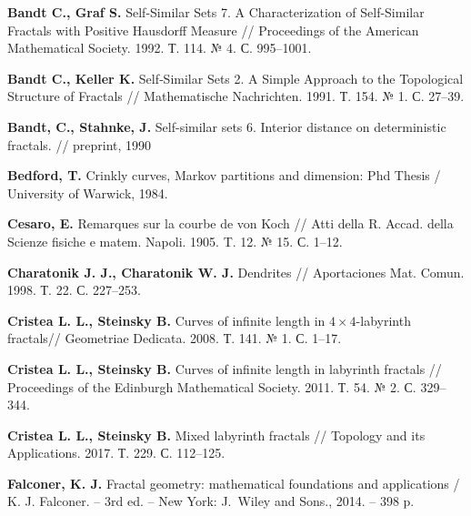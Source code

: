 %
%




\begin{thebibliography}{99}

{\bf Bandt C., Graf S. }
Self-Similar Sets 7. A Characterization of Self-Similar Fractals with Positive Hausdorff Measure // Proceedings of the American Mathematical Society. 1992. Т. 114. № 4. С. 995–1001.

{\bf Bandt C., Keller K.}
Self‐Similar Sets 2. A Simple Approach to the Topological Structure of Fractals // 
Mathematische Nachrichten. 1991. Т. 154. № 1. С. 27--39.

{\bf Bandt, C., Stahnke, J.}
Self-similar sets 6. Interior distance on deterministic fractals. //
preprint, 1990

{\bf Bedford, T. }
Crinkly curves, Markov partitions and dimension: Phd Thesis / University of Warwick, 1984.

{\bf Cesaro, E.} 
Remarques sur la courbe de von Koch // 
Atti della R. Accad. della Scienze fisiche e matem. Napoli. 1905. T. 12. № 15. С. 1--12.

{\bf Charatonik J. J., Charatonik W. J.}
Dendrites // 
Aportaciones Mat. Comun. 1998. Т. 22. С. 227--253.

{\bf Cristea L. L., Steinsky B. }
Curves of infinite length in $4\times4$-labyrinth fractals// 
Geometriae Dedicata. 2008. Т. 141. № 1. С. 1--17.


{\bf Cristea L. L., Steinsky B. }
Curves of infinite length in labyrinth fractals // 
Proceedings of the Edinburgh Mathematical Society. 2011. Т. 54. № 2. С. 329--344.


{\bf Cristea L. L., Steinsky B. }
Mixed labyrinth fractals // 
Topology and its Applications. 2017. Т. 229. С. 112--125.

{\bf Falconer, K. J.} 
Fractal geometry: mathematical foundations and applications / 
K. J. Falconer. -- 3rd ed. -- New York: J.~Wiley and Sons., 2014. -- 398 p.


\end{thebibliography}
